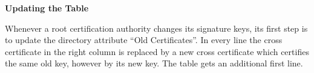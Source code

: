 {\bf Updating the Table}
\label{ds-ut}

Whenever a root certification authority changes its
signature keys, its first step is to update the directory attribute
``Old Certificates''.
In every line the cross certificate in the right column is replaced
by a new cross certificate which certifies the same old key,
however by its new key.
The table gets an additional first line.

